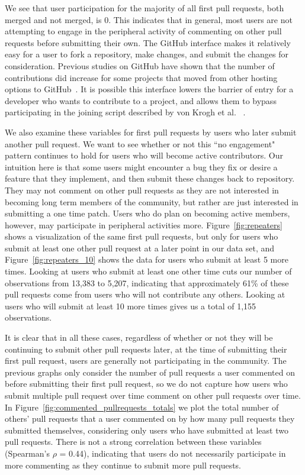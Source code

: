 \documentclass{sigchi}
\begin{document}
We see that user participation for the majority of all first pull requests, both
merged and not merged, is 0. This indicates that in general, most users are not
attempting to engage in the peripheral activity of commenting on other pull
requests before submitting their own. The GitHub interface makes it relatively
easy for a user to fork a repository, make changes, and submit the changes for
consideration. Previous studies on GitHub have shown that the number of
contributions did increase for some projects that moved from other hosting
options to GitHub~\cite{mcdonald_performance_2013}. It is possible this
interface lowers the barrier of entry for a developer who wants to contribute to
a project, and allows them to bypass participating in the joining script
described by von Krogh et al. ~\cite{von_krogh_community_2003}.

We also examine these variables for first pull requests by users who later
submit another pull request. We want to see whether or not this ``no engagement"
pattern continues to hold for users who will become active contributors. Our
intuition here is that some users might encounter a bug they fix or desire a
feature that they implement, and then submit these changes back to repository.
They may not comment on other pull requests as they are not interested in
becoming long term members of the community, but rather are just interested in
submitting a one time patch. Users who do plan on becoming active members,
however, may participate in peripheral activities more.
Figure~\ref{fig:repeaters} shows a visualization of the same first pull
requests, but only for users who submit at least one other pull request at a
later point in our data set, and Figure~\ref{fig:repeaters_10} shows the data
for users who submit at least 5 more times. Looking at users who submit at least
one other time cuts our number of observations from 13,383 to 5,207, indicating
that approximately 61\% of these pull requests come from users who will not
contribute any others. Looking at users who will submit at least 10 more times
gives us a total of 1,155 observations.

It is clear that in all these cases, regardless of whether or not they will be
continuing to submit other pull requests later, at the time of submitting their
first pull request, users are generally not participating in the community. The
previous graphs only consider the number of pull requests a user commented on
before submitting their first pull request, so we do not capture how users who
submit multiple pull request over time comment on other pull requests over time.
In Figure~\ref{fig:commented_pullrequests_totals} we plot the total number of
others' pull requests that a user commented on by how many pull requests they
submitted themselves, considering only users who have submitted at least two
pull requests. There is not a strong correlation between these variables
(Spearman's $\rho$  = 0.44), indicating that users do not necessarily
participate in more commenting as they continue to submit more pull requests.
\end{document}

